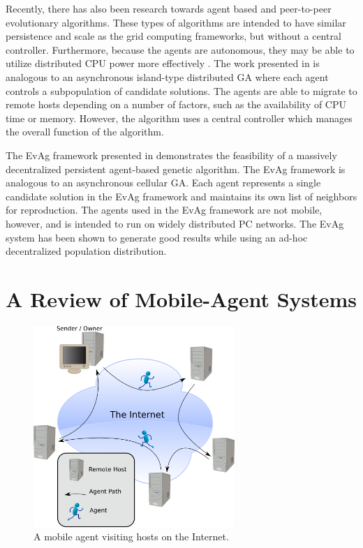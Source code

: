     Recently, there has also been research towards agent based and peer-to-peer
      evolutionary algorithms. 
    These types of algorithms are intended to have similar persistence and
      scale as the grid computing frameworks, but without a central controller.
    Furthermore, because the agents are autonomous, they may be able to
      utilize distributed CPU power more effectively \cite{Laredo2010, Lee2011}. 
    The work presented in \cite{Lee2011} is analogous to an asynchronous
      island-type distributed GA where each agent controls a subpopulation of
      candidate solutions. 
    The agents are able to migrate to remote hosts depending on a number of
      factors, such as the availability of CPU time or memory. 
    However, the algorithm uses a central controller which manages the overall
      function of the algorithm.

    The EvAg framework presented in \cite{Laredo2010} demonstrates the feasibility
      of a massively decentralized persistent agent-based genetic algorithm. 
    The EvAg framework is analogous to an asynchronous cellular GA. 
    Each agent represents a single candidate solution in the EvAg framework and
      maintains its own list of neighbors for reproduction.  
    The agents used in the EvAg framework are not mobile, however, and is
      intended to run on widely distributed PC networks. 
    The EvAg system has been shown to generate good results while using an ad-hoc
      decentralized population distribution.

  \section{A Review of Mobile-Agent Systems} %
    \begin{figure}[!ht]
    \begin{center}
       \includegraphics[width=3in]{figures/internet_agencies}
    \end{center}
    \caption{\label{fig:internet_agencies}A mobile agent visiting hosts
    on the Internet.}
    \end{figure}

